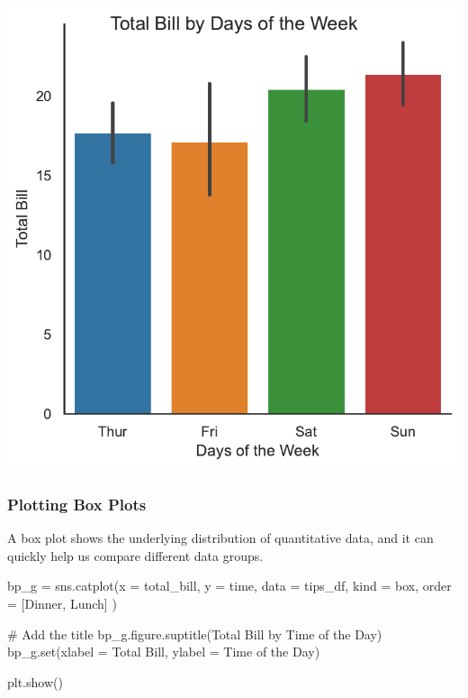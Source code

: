 \documentclass[
  letterpaper,
  DIV=11,
  numbers=noendperiod]{scrartcl}
\newenvironment{Shaded}{\begin{snugshade}}{\end{snugshade}}
\newcommand{\BuiltInTok}[1]{\textcolor[rgb]{0.00,0.46,0.62}{#1}}
\newcommand{\CommentTok}[1]{\textcolor[rgb]{0.37,0.37,0.37}{#1}}
\newcommand{\NormalTok}[1]{\textcolor[rgb]{0.00,0.46,0.62}{#1}}
\newcommand{\OperatorTok}[1]{\textcolor[rgb]{0.37,0.37,0.37}{#1}}
\newcommand{\StringTok}[1]{\textcolor[rgb]{0.13,0.47,0.30}{#1}}
\begin{document}
\includegraphics{data_visualization_with_seaborn_files/figure-pdf/cell-15-output-1.pdf}

\hypertarget{plotting-box-plots}{%
\subsubsection{Plotting Box Plots}\label{plotting-box-plots}}

A box plot shows the underlying distribution of quantitative data, and
it can quickly help us compare different data groups.

\begin{Shaded}
\begin{Highlighting}[]
\NormalTok{bp\_g }\OperatorTok{=}\NormalTok{ sns.catplot(x }\OperatorTok{=} \StringTok{\textquotesingle{}total\_bill\textquotesingle{}}\NormalTok{,}
\NormalTok{                   y }\OperatorTok{=} \StringTok{\textquotesingle{}time\textquotesingle{}}\NormalTok{,}
\NormalTok{                   data }\OperatorTok{=}\NormalTok{ tips\_df,}
\NormalTok{                   kind }\OperatorTok{=} \StringTok{\textquotesingle{}box\textquotesingle{}}\NormalTok{,}
\NormalTok{                   order }\OperatorTok{=}\NormalTok{ [}\StringTok{\textquotesingle{}Dinner\textquotesingle{}}\NormalTok{, }\StringTok{\textquotesingle{}Lunch\textquotesingle{}}\NormalTok{]}
\NormalTok{                  )}

\CommentTok{\# Add the title}
\NormalTok{bp\_g.figure.suptitle(}\StringTok{\textquotesingle{}Total Bill by Time of the Day\textquotesingle{}}\NormalTok{)}
\NormalTok{bp\_g.}\BuiltInTok{set}\NormalTok{(xlabel }\OperatorTok{=} \StringTok{\textquotesingle{}Total Bill\textquotesingle{}}\NormalTok{,}
\NormalTok{          ylabel }\OperatorTok{=} \StringTok{\textquotesingle{}Time of the Day\textquotesingle{}}\NormalTok{)}
          
\NormalTok{plt.show()}
\end{Highlighting}
\end{Shaded}
\end{document}
